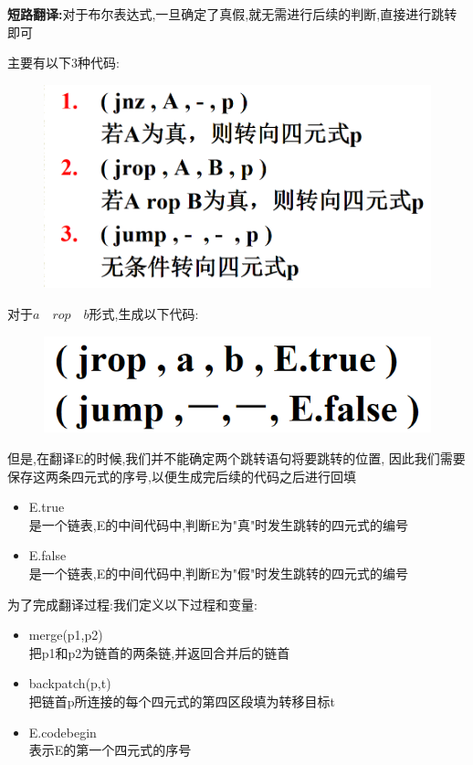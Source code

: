 \documentclass[UTF8,a4paper]{ctexart}
\begin{document}
 \textbf{短路翻译:}对于布尔表达式,一旦确定了真假,就无需进行后续的判断,直接进行跳转即可

 主要有以下3种代码:
 \begin{figure}[H]
  \centering
  \includegraphics[scale = 0.3]{assets/CompilerConstructionPrinciples_36d92.png}
 \end{figure}

 对于$a\quad rop\quad b$形式,生成以下代码:
 \begin{figure}[H]
  \centering
  \includegraphics[scale = 0.3]{assets/CompilerConstructionPrinciples_7394b.png}
 \end{figure}

 但是,在翻译E的时候,我们并不能确定两个跳转语句将要跳转的位置,
 因此我们需要保存这两条四元式的序号,以便生成完后续的代码之后进行回填

 \begin{itemize}
  \item E.true \\
        是一个链表,E的中间代码中,判断E为"真"时发生跳转的四元式的编号
  \item E.false \\
        是一个链表,E的中间代码中,判断E为"假"时发生跳转的四元式的编号
 \end{itemize}

 为了完成翻译过程:我们定义以下过程和变量:
 \begin{itemize}
  \item merge(p1,p2)\\
        把p1和p2为链首的两条链,并返回合并后的链首
  \item backpatch(p,t)\\
        把链首p所连接的每个四元式的第四区段填为转移目标t
  \item E.codebegin\\
        表示E的第一个四元式的序号
 \end{itemize}
\end{document}
